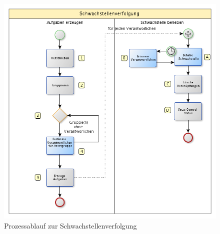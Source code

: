 \documentclass[a4paper,10pt]{book}
\begin{document}
\begin{figure}[htb!]
  \centering
  \includegraphics[scale=.54]{Screenshot/GSM-Vulnerability-Tracking-Process.png}
  \caption{\label{Prozessablauf zur Schwachstellenverfolgung} Prozessablauf zur Schwachstellenverfolgung}
\end{figure}
\newline
\end{document}

